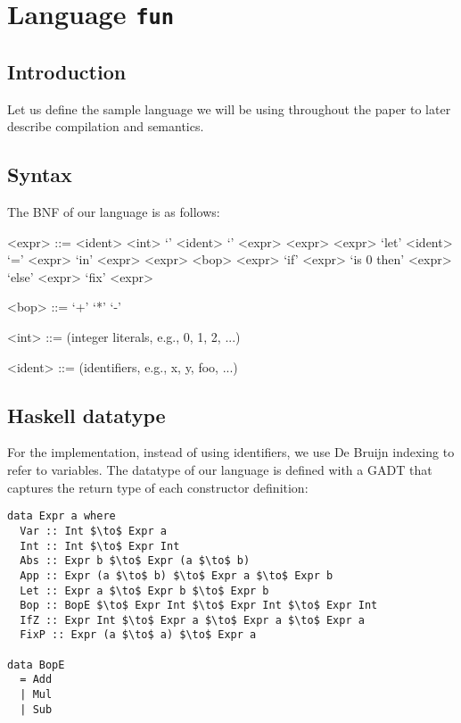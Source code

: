 \section{Language \texttt{fun}}
\subsection{Introduction}
Let us define the sample language we will be using throughout the paper to later describe compilation and semantics.
\subsection{Syntax}
The BNF of our language is as follows:

\begin{grammar}

<expr> ::= <ident>
\alt <int>
\alt `\lambda' <ident> `\to' <expr>
\alt <expr> <expr>
\alt `let' <ident> `=' <expr> `in' <expr>
\alt <expr> <bop> <expr>
\alt `if' <expr> `is 0 then' <expr> `else' <expr>
\alt `fix' <expr>

<bop> ::= `+'
\alt `*'
\alt `-'

<int> ::= (integer literals, e.g., 0, 1, 2, ...)

<ident> ::= (identifiers, e.g., x, y, foo, ...)

\end{grammar}

\subsection{Haskell datatype}
For the implementation, instead of using identifiers, we use De Bruijn indexing to refer to variables.
The datatype of our language is defined with a GADT that captures the return type
of each constructor definition:

\begin{lstlisting}[mathescape]
data Expr a where
  Var :: Int $\to$ Expr a
  Int :: Int $\to$ Expr Int
  Abs :: Expr b $\to$ Expr (a $\to$ b)
  App :: Expr (a $\to$ b) $\to$ Expr a $\to$ Expr b
  Let :: Expr a $\to$ Expr b $\to$ Expr b
  Bop :: BopE $\to$ Expr Int $\to$ Expr Int $\to$ Expr Int
  IfZ :: Expr Int $\to$ Expr a $\to$ Expr a $\to$ Expr a
  FixP :: Expr (a $\to$ a) $\to$ Expr a

data BopE
  = Add
  | Mul
  | Sub
\end{lstlisting}
